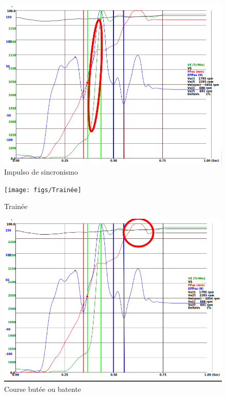 \begin{figure}[H]
\centering
\includegraphics[scale=0.5]{figs/ImpulsoSincronismo}
\caption{Impulso de sincronismo \cite{passagemMud}}\label{imp}
\end{figure}

\begin{figure}[H]
\centering
\texttt{[image: figs/Trainée]}
\caption{Trainée \cite{passagemMud}}\label{Trainee}
\end{figure}

\begin{figure}[H]
\centering
\includegraphics[scale=0.5]{figs/course}
\caption{Course butée ou batente \cite{passagemMud}}\label{batente}
\end{figure}

